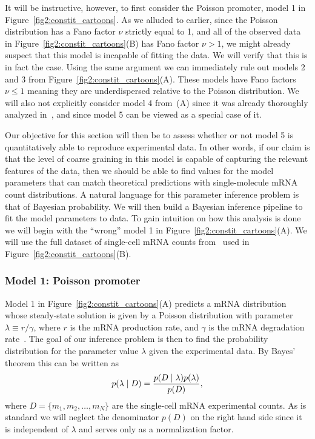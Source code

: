 It will be instructive, however, to first consider the Poisson promoter, model 1
in Figure~\ref{fig2:constit_cartoons}. As we alluded to earlier, since the
Poisson distribution has a Fano factor $\nu$ strictly equal to 1, and all of the
observed data in Figure~\ref{fig2:constit_cartoons}(B) has Fano factor $\nu>1$,
we might already suspect that this model is incapable of fitting the data. We
will verify that this is in fact the case. Using the same argument we can
immediately rule out models 2 and 3 from Figure~\ref{fig2:constit_cartoons}(A).
These models have Fano factors $\nu\le 1$ meaning they are underdispersed
relative to the Poisson distribution. We will also not explicitly consider model
4 from~(A) since it was already thoroughly analyzed
in~\cite{Razo-Mejia2020}, and since model 5 can be viewed as a special case of
it.

Our objective for this section will then be to assess whether or not model 5 is
quantitatively able to reproduce experimental data. In other words, if our claim
is that the level of coarse graining in this model is capable of capturing the
relevant features of the data, then we should be able to find values for the
model parameters that can match theoretical predictions with single-molecule
mRNA count distributions. A natural language for this parameter inference
problem is that of Bayesian probability. We will then build a Bayesian inference
pipeline to fit the model parameters to data. To gain intuition on how this
analysis is done we will begin with the ``wrong'' model 1 in
Figure~\ref{fig2:constit_cartoons}(A). We will use the full dataset of
single-cell mRNA counts from~\cite{Jones2014} used in
Figure~\ref{fig2:constit_cartoons}(B).

\subsubsection{Model 1: Poisson promoter}

Model 1 in Figure~\ref{fig2:constit_cartoons}(A) predicts a  mRNA distribution
whose steady-state solution is given by a Poisson distribution with parameter
$\lambda \equiv r / \gamma$, where $r$ is the mRNA production rate, and $\gamma$
is the mRNA degradation rate~\cite{Sanchez2013}. The goal of our inference
problem is then to find the probability distribution for the parameter value
$\lambda$ given the experimental data. By Bayes' theorem this can be written as
\begin{equation}
p(\lambda \mid D) = {p(D \mid \lambda) p(\lambda) \over p(D)},
\end{equation}
where $D = \{m_1, m_2, \ldots, m_N \}$ are the single-cell mRNA experimental
counts. As is standard we will neglect the denominator $p(D)$ on the right
hand side since it is independent of $\lambda$ and serves only as a
normalization factor.

